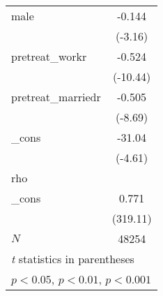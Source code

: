 {\begin{tabular}{l*{1}{c}}
male        &      -0.144\sym{**} \\
            &     (-3.16)         \\
[1em]
pretreat\_workr&      -0.524\sym{***}\\
            &    (-10.44)         \\
[1em]
pretreat\_marriedr&      -0.505\sym{***}\\
            &     (-8.69)         \\
[1em]
\_cons      &      -31.04\sym{***}\\
            &     (-4.61)         \\
\hline
rho         &                     \\
\_cons      &       0.771\sym{***}\\
            &    (319.11)         \\
\hline
\(N\)       &       48254         \\
\hline\hline
\multicolumn{2}{l}{\footnotesize \textit{t} statistics in parentheses}\\
\multicolumn{2}{l}{\footnotesize \sym{*} \(p<0.05\), \sym{**} \(p<0.01\), \sym{***} \(p<0.001\)}\\
\end{tabular}
}

